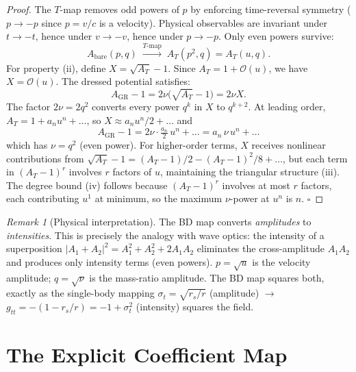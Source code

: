 \documentclass[11pt,a4paper]{article}
\theoremstyle{plain}
\theoremstyle{definition}
\theoremstyle{remark}
\newtheorem{remark}[theorem]{Remark}
\newcommand{\sigt}{\sigma_t}
\newcommand{\GR}{\mathrm{GR}}
\newcommand{\bare}{\mathrm{bare}}
\begin{document}
\begin{proof}
The $T$-map removes odd powers of $p$ by enforcing time-reversal symmetry
($p \to -p$ since $p = v/c$ is a velocity). Physical observables are invariant
under $t \to -t$, hence under $v \to -v$, hence under $p \to -p$.  Only even
powers survive:
\begin{equation}
  A_\bare(p,q)\;\xrightarrow{T\text{-map}}\;A_T(p^2,q) = A_T(u,q).
\end{equation}
For property (ii), define $X = \sqrt{A_T} - 1$.  Since $A_T = 1 + \mathcal{O}(u)$,
we have $X = \mathcal{O}(u)$.  The dressed potential satisfies:
\begin{equation}
  A_\GR - 1 = 2\nu\bigl(\sqrt{A_T} - 1\bigr) = 2\nu X.
\end{equation}
The factor $2\nu = 2q^2$ converts every power $q^k$ in $X$ to $q^{k+2}$.  At
leading order, $A_T = 1 + a_n u^n + \ldots$, so $X \approx a_n u^n/2 + \ldots$
and
\begin{equation}
  A_\GR - 1 = 2\nu \cdot \tfrac{a_n}{2}\,u^n + \ldots = a_n\,\nu\,u^n + \ldots
\end{equation}
which has $\nu = q^2$ (even power). For higher-order terms, $X$ receives
nonlinear contributions from $\sqrt{A_T} - 1 = (A_T-1)/2 - (A_T-1)^2/8 + \ldots$,
but each term in $(A_T-1)^r$ involves $r$ factors of $u$, maintaining the
triangular structure (iii).  The degree bound (iv) follows because $(A_T-1)^r$
involves at most $r$ factors, each contributing $u^1$ at minimum, so the maximum
$\nu$-power at $u^n$ is $n$. \qquad $\square$
\end{proof}

\begin{remark}[Physical interpretation]
The BD map converts \emph{amplitudes} to \emph{intensities}.  This is precisely
the analogy with wave optics: the intensity of a superposition
$|A_1 + A_2|^2 = A_1^2 + A_2^2 + 2A_1 A_2$ eliminates the cross-amplitude
$A_1 A_2$ and produces only intensity terms (even powers).
$p = \sqrt{u}$ is the velocity amplitude; $q = \sqrt{\nu}$ is the mass-ratio
amplitude.  The BD map squares both, exactly as the single-body mapping
$\sigt = \sqrt{r_s/r}$ (amplitude) $\to$ $g_{tt} = -(1-r_s/r) = -1+\sigt^2$
(intensity) squares the field.
\end{remark}

\section{The Explicit Coefficient Map}
\label{sec:coefficients}
\end{document}
